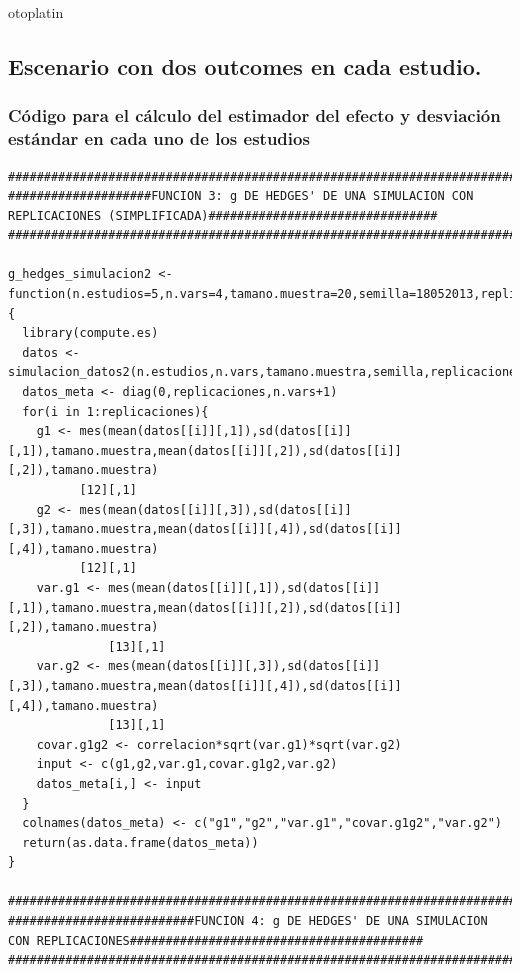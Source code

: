 otoplatin\documentclass[a4paper,openright,12pt]{report}
\begin{document}
\subsection{Escenario con dos outcomes en cada estudio.}

\subsubsection{Código para el cálculo del estimador del efecto y desviación estándar en cada uno de los estudios}
{\tiny
\begin{verbatim}
##############################################################################################################################
####################FUNCION 3: g DE HEDGES' DE UNA SIMULACION CON REPLICACIONES (SIMPLIFICADA)################################
##############################################################################################################################

g_hedges_simulacion2 <- function(n.estudios=5,n.vars=4,tamano.muestra=20,semilla=18052013,replicaciones=5,correlacion=0){
  library(compute.es)
  datos <- simulacion_datos2(n.estudios,n.vars,tamano.muestra,semilla,replicaciones) 
  datos_meta <- diag(0,replicaciones,n.vars+1)
  for(i in 1:replicaciones){
    g1 <- mes(mean(datos[[i]][,1]),sd(datos[[i]][,1]),tamano.muestra,mean(datos[[i]][,2]),sd(datos[[i]][,2]),tamano.muestra)
          [12][,1]
    g2 <- mes(mean(datos[[i]][,3]),sd(datos[[i]][,3]),tamano.muestra,mean(datos[[i]][,4]),sd(datos[[i]][,4]),tamano.muestra)
          [12][,1]
    var.g1 <- mes(mean(datos[[i]][,1]),sd(datos[[i]][,1]),tamano.muestra,mean(datos[[i]][,2]),sd(datos[[i]][,2]),tamano.muestra)
              [13][,1]
    var.g2 <- mes(mean(datos[[i]][,3]),sd(datos[[i]][,3]),tamano.muestra,mean(datos[[i]][,4]),sd(datos[[i]][,4]),tamano.muestra)
              [13][,1]
    covar.g1g2 <- correlacion*sqrt(var.g1)*sqrt(var.g2)
    input <- c(g1,g2,var.g1,covar.g1g2,var.g2)
    datos_meta[i,] <- input
  }
  colnames(datos_meta) <- c("g1","g2","var.g1","covar.g1g2","var.g2")
  return(as.data.frame(datos_meta))
}

##############################################################################################################################
##########################FUNCION 4: g DE HEDGES' DE UNA SIMULACION CON REPLICACIONES#########################################
##############################################################################################################################


\end{verbatim}}
\end{document}
